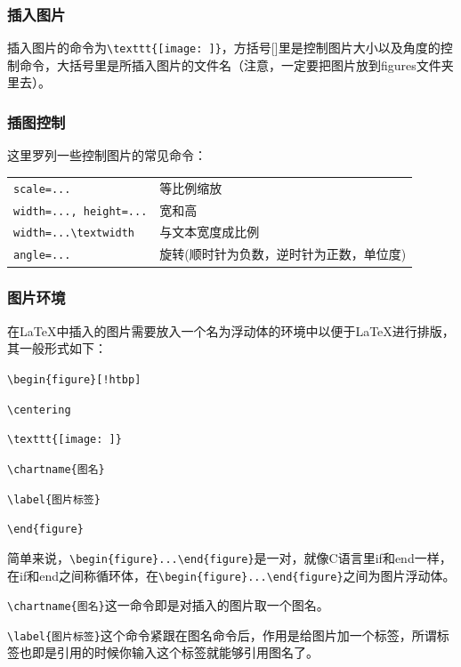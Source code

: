 \subsubsection{插入图片}

插入图片的命令为\verb|\texttt{[image: ]}|，方括号[]里是控制图片大小以及角度的控制命令，大括号{}里是所插入图片的文件名（注意，一定要把图片放到figures文件夹里去）。
\subsubsection{插图控制}

这里罗列一些控制图片的常见命令：

\begin{tabular}{ll}
\verb|scale=...| & 等比例缩放 \\
\verb|width=..., height=...| & 宽和高 \\
\verb|width=...\textwidth| & 与文本宽度成比例\\
\verb|angle=...| & 旋转(顺时针为负数，逆时针为正数，单位度)\\
\end{tabular}

\subsubsection{图片环境}

在\LaTeX 中插入的图片需要放入一个名为浮动体的环境中以便于\LaTeX 进行排版，其一般形式如下：

\verb|\begin{figure}[!htbp]|\par
\verb|\centering|\par
\verb|\texttt{[image: ]}|\par
\verb|\chartname{图名}|\par
\verb|\label{图片标签}|\par
\verb|\end{figure}|

简单来说，\verb|\begin{figure}...\end{figure}|是一对，就像C语言里if和end一样，在if和end之间称循环体，在\verb|\begin{figure}...\end{figure}|之间为图片浮动体。

\verb|\chartname{图名}|这一命令即是对插入的图片取一个图名。

\verb|\label{图片标签}|这个命令紧跟在图名命令后，作用是给图片加一个标签，所谓标签也即是引用的时候你输入这个标签就能够引用图名了。

